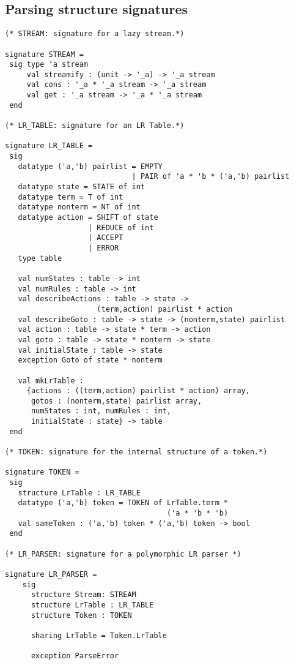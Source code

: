 \documentclass{article}
\begin{document}
\subsection{Parsing structure signatures}

\begin{tt}
\begin{verbatim}
(* STREAM: signature for a lazy stream.*)

signature STREAM =
 sig type 'a stream
     val streamify : (unit -> '_a) -> '_a stream
     val cons : '_a * '_a stream -> '_a stream
     val get : '_a stream -> '_a * '_a stream
 end

(* LR_TABLE: signature for an LR Table.*)

signature LR_TABLE =
 sig
   datatype ('a,'b) pairlist = EMPTY
                             | PAIR of 'a * 'b * ('a,'b) pairlist
   datatype state = STATE of int
   datatype term = T of int
   datatype nonterm = NT of int
   datatype action = SHIFT of state
                   | REDUCE of int
                   | ACCEPT
                   | ERROR
   type table
	
   val numStates : table -> int
   val numRules : table -> int
   val describeActions : table -> state ->
                     (term,action) pairlist * action
   val describeGoto : table -> state -> (nonterm,state) pairlist
   val action : table -> state * term -> action
   val goto : table -> state * nonterm -> state
   val initialState : table -> state
   exception Goto of state * nonterm

   val mkLrTable :
     {actions : ((term,action) pairlist * action) array,
      gotos : (nonterm,state) pairlist array,
      numStates : int, numRules : int,
      initialState : state} -> table
 end

(* TOKEN: signature for the internal structure of a token.*)

signature TOKEN =
 sig
   structure LrTable : LR_TABLE
   datatype ('a,'b) token = TOKEN of LrTable.term *
                                     ('a * 'b * 'b)
   val sameToken : ('a,'b) token * ('a,'b) token -> bool
 end

(* LR_PARSER: signature for a polymorphic LR parser *)

signature LR_PARSER =
    sig
      structure Stream: STREAM
      structure LrTable : LR_TABLE
      structure Token : TOKEN

      sharing LrTable = Token.LrTable

      exception ParseError


\end{verbatim}
\end{tt}
\end{document}
